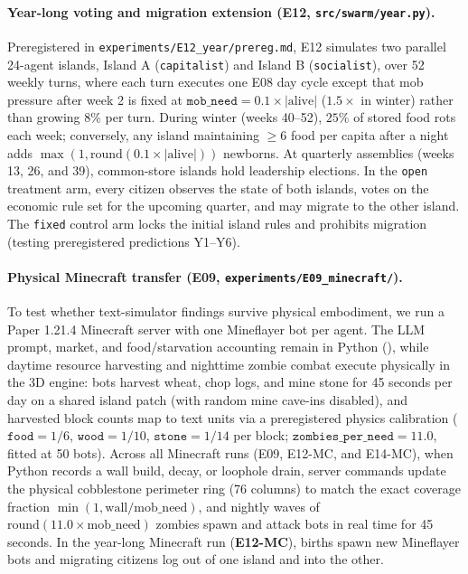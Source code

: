 \documentclass[10pt,letterpaper]{article}
\begin{document}
\paragraph{Year-long voting and migration extension (E12, \texttt{src/\allowbreak swarm/\allowbreak year.py}).}
Preregistered in \texttt{ex\-per\-i\-ments/\allowbreak E12\_year/\allowbreak prereg.md}, E12 simulates two parallel 24-agent islands, Island A (\texttt{capitalist}) and Island B (\texttt{socialist}), over 52 weekly turns, where each turn executes one E08 day cycle except that mob pressure after week 2 is fixed at $\texttt{mob\_need} = 0.1 \times |\text{alive}|$ ($1.5\times$ in winter) rather than growing $8\%$ per turn. During winter (weeks 40--52), $25\%$ of stored food rots each week; conversely, any island maintaining $\ge 6$ food per capita after a night adds $\max(1, \text{round}(0.1 \times |\text{alive}|))$ newborns. At quarterly assemblies (weeks 13, 26, and 39), common-store islands hold leadership elections. In the \texttt{open} treatment arm, every citizen observes the state of both islands, votes on the economic rule set for the upcoming quarter, and may migrate to the other island. The \texttt{fixed} control arm locks the initial island rules and prohibits migration (testing preregistered predictions Y1--Y6).

\paragraph{Physical Minecraft transfer (E09, \texttt{experiments/E09\_minecraft/}).}
To test whether text-simulator findings survive physical embodiment, we run a Paper 1.21.4 Minecraft server with one Mineflayer bot per agent. The LLM prompt, market, and food/starvation accounting remain in Python (), while daytime resource harvesting and nighttime zombie combat execute physically in the 3D engine: bots harvest wheat, chop logs, and mine stone for 45 seconds per day on a shared island patch (with random mine cave-ins disabled), and harvested block counts map to text units via a preregistered physics calibration ($\texttt{food}=1/6$, $\texttt{wood}=1/10$, $\texttt{stone}=1/14$ per block; $\texttt{zombies\_per\_need}=11.0$, fitted at 50 bots). Across all Minecraft runs (E09, E12-MC, and E14-MC), when Python records a wall build, decay, or loophole drain, server commands update the physical cobblestone perimeter ring (76 columns) to match the exact coverage fraction $\min(1, \text{wall}/\text{mob\_need})$, and nightly waves of $\text{round}(11.0 \times \text{mob\_need})$ zombies spawn and attack bots in real time for 45 seconds. In the year-long Minecraft run (\textbf{E12-MC}), births spawn new Mineflayer bots and migrating citizens log out of one island and into the other.
\end{document}
